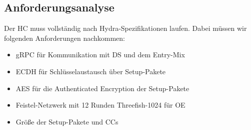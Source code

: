 \subsection{Anforderungsanalyse}

Der \ac{HC} muss vollständig nach Hydra-Spezifikationen laufen.
Dabei müssen wir folgenden Anforderungen nachkommen: 
\begin{itemize}
	\item  \ac{gRPC} für Kommunikation mit \ac{DS} und dem Entry-Mix 
	\item \ac{ECDH} für Schlüsselaustausch über Setup-Pakete 
	\item \ac{AES} für die Authenticated Encryption der Setup-Pakete 
	\item Feistel-Netzwerk mit 12 Runden Threefish-1024 für \ac{OE}
	\item Größe der Setup-Pakete und \acp{CC}
\end{itemize}
